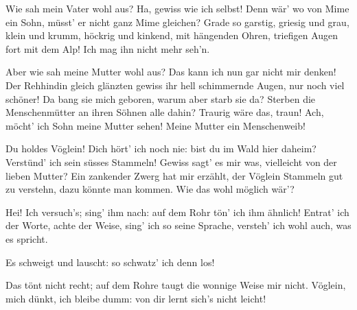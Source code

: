 \begin{drama}
Wie sah mein Vater wohl aus?
Ha, gewiss wie ich selbst!
Denn wär' wo von Mime ein Sohn,
müsst' er nicht ganz
Mime gleichen?
Grade so garstig,
griesig und grau,
klein und krumm,
höckrig und kinkend,
mit hängenden Ohren,
triefigen Augen
fort mit dem Alp!
Ich mag ihn nicht mehr seh'n.


Aber wie sah
meine Mutter wohl aus?
Das kann ich
nun gar nicht mir denken!
Der Rehhindin gleich
glänzten gewiss
ihr hell schimmernde Augen,
nur noch viel schöner!
Da bang sie mich geboren,
warum aber starb sie da?
Sterben die Menschenmütter
an ihren Söhnen
alle dahin?
Traurig wäre das, traun!
Ach, möcht' ich Sohn
meine Mutter sehen!
Meine Mutter
ein Menschenweib!


Du holdes Vöglein!
Dich hört' ich noch nie:
bist du im Wald hier daheim?
Verstünd' ich sein süsses Stammeln!
Gewiss sagt' es mir was,
vielleicht von der lieben Mutter?
Ein zankender Zwerg
hat mir erzählt,
der Vöglein Stammeln
gut zu verstehn,
dazu könnte man kommen.
Wie das wohl möglich wär'?


Hei! Ich versuch's;
sing' ihm nach:
auf dem Rohr tön' ich ihm ähnlich!
Entrat' ich der Worte,
achte der Weise,
sing' ich so seine Sprache,
versteh' ich wohl auch, was es spricht.


Es schweigt und lauscht:
so schwatz' ich denn los!


Das tönt nicht recht;
auf dem Rohre taugt
die wonnige Weise mir nicht.
Vöglein, mich dünkt,
ich bleibe dumm:
von dir lernt sich's nicht leicht!



\end{drama}
